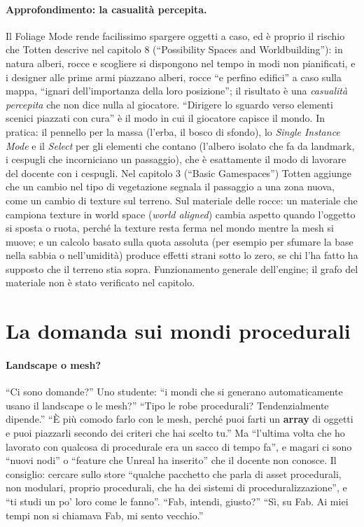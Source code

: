 \paragraph{Approfondimento: la casualità percepita.} Il Foliage Mode rende facilissimo
spargere oggetti a caso, ed è proprio il rischio che Totten descrive nel capitolo 8
(``Possibility Spaces and Worldbuilding''): in natura alberi, rocce e scogliere si dispongono
nel tempo in modi non pianificati, e i designer alle prime armi piazzano alberi, rocce ``e
perfino edifici'' a caso sulla mappa, ``ignari dell'importanza della loro posizione''; il
risultato è una \emph{casualità percepita} che non dice nulla al giocatore. ``Dirigere lo
sguardo verso elementi scenici piazzati con cura'' è il modo in cui il giocatore capisce il
mondo. In pratica: il pennello per la massa (l'erba, il bosco di sfondo), lo \emph{Single
Instance Mode} e il \emph{Select} per gli elementi che contano (l'albero isolato che fa da
landmark, i cespugli che incorniciano un passaggio), che è esattamente il modo di lavorare del
docente con i cespugli. Nel capitolo 3 (``Basic Gamespaces'') Totten aggiunge che un cambio
nel tipo di vegetazione segnala il passaggio a una zona nuova, come un cambio di texture sul
terreno. Sul materiale delle rocce: un materiale che campiona texture in world space
(\emph{world aligned}) cambia aspetto quando l'oggetto si sposta o ruota, perché la texture
resta ferma nel mondo mentre la mesh si muove; e un calcolo basato sulla quota assoluta (per
esempio per sfumare la base nella sabbia o nell'umidità) produce effetti strani sotto lo
zero, se chi l'ha fatto ha supposto che il terreno stia sopra. Funzionamento generale
dell'engine; il grafo del materiale non è stato verificato nel capitolo.

\section{La domanda sui mondi procedurali}
\label{ue15:sec:procedurale}

\paragraph{Landscape o mesh?} ``Ci sono domande?'' Uno studente: ``i mondi che si generano
automaticamente usano il landscape o le mesh?'' ``Tipo le robe procedurali? Tendenzialmente
dipende.'' ``È più comodo farlo con le mesh, perché puoi farti un \textbf{array} di oggetti e
puoi piazzarli secondo dei criteri che hai scelto tu.'' Ma ``l'ultima volta che ho lavorato
con qualcosa di procedurale era un sacco di tempo fa'', e magari ci sono ``nuovi nodi'' o
``feature che Unreal ha inserito'' che il docente non conosce. Il consiglio: cercare sullo store
``qualche pacchetto che parla di asset procedurali, non modulari, proprio procedurali, che ha
dei sistemi di proceduralizzazione'', e ``ti studi un po' loro come le fanno''. ``Fab, intendi,
giusto?'' ``Sì, su Fab. Ai miei tempi non si chiamava Fab, mi sento vecchio.''

